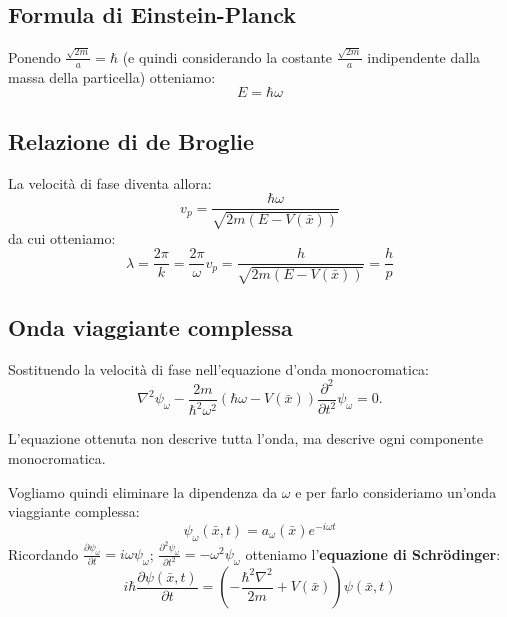 \subsection{Formula di Einstein-Planck} %
Ponendo $\frac{\sqrt{2m}}{a}=\hbar $ (e quindi considerando la costante $\frac{\sqrt{2m}}{a}$ indipendente dalla massa della particella) otteniamo:
\begin{equation}
E=\hbar \omega 
\end{equation}

\subsection{Relazione di de Broglie} %
La velocità di fase diventa allora:
\begin{equation}
v_p=\frac{\hbar \omega }{\sqrt{2m(E-V\left(\bar x\right))}}
\end{equation}
da cui otteniamo:
\begin{equation}
\lambda =\frac{2\pi}{k}=\frac{2\pi}{\omega}v_p=\frac{h}{\sqrt{2m(E-V\left(\bar x\right))}}=\frac{h}{p}
\end{equation}

\subsection{Onda viaggiante complessa} %
Sostituendo la velocità di fase nell'equazione d'onda monocromatica:
\begin{equation}
\nabla ^2\psi_{\omega} -\frac{2m}{\hbar ^2\omega ^2}\left(\hbar \omega -V\left(\bar x\right)\right)\frac{\partial  ^2}{\partial t^2}\psi_{\omega} =0.
\end{equation}

L'equazione ottenuta non descrive tutta l'onda, ma descrive ogni componente monocromatica.

Vogliamo quindi eliminare la dipendenza da $\omega $ e per farlo consideriamo un'onda viaggiante complessa:
\begin{equation}
\psi_{\omega} \left(\bar x, t\right)=a_{\omega }\left(\bar x\right)e^{-i\omega t}
\end{equation}
Ricordando $\frac{\partial \psi_{\omega}}{\partial t}=i\omega \psi_{\omega}$; $\frac{\partial^2 \psi_{\omega}}{\partial t^2}=-\omega^2 \psi_{\omega}$
otteniamo l'\textbf{equazione di Schrödinger}:
\begin{equation}
\label{eq:schrodinger}
i\hbar \frac{\partial \psi \left(\bar x, t\right)}{\partial  t}=\left(-\frac{\hbar ^2\nabla ^2}{2m}+V\left(\bar x\right)\right)\psi \left(\bar x, t\right)
\end{equation}

%